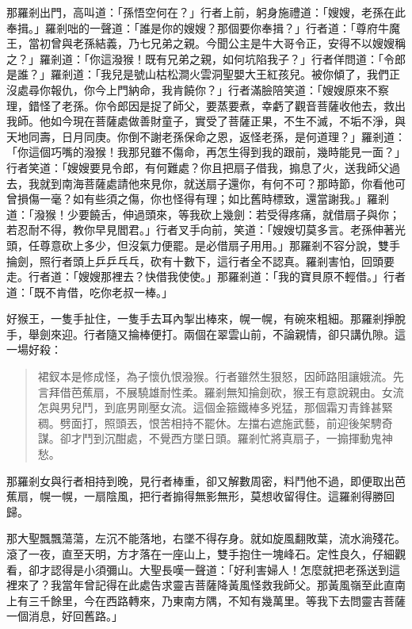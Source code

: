 那羅剎出門，高叫道：「孫悟空何在？」行者上前，躬身施禮道：「嫂嫂，老孫在此奉揖。」羅剎咄的一聲道：「誰是你的嫂嫂？那個要你奉揖？」行者道：「尊府牛魔王，當初曾與老孫結義，乃七兄弟之親。今聞公主是牛大哥令正，安得不以嫂嫂稱之？」羅剎道：「你這潑猴！既有兄弟之親，如何坑陷我子？」行者佯問道：「令郎是誰？」羅剎道：「我兒是號山枯松澗火雲洞聖嬰大王紅孩兒。被你傾了，我們正沒處尋你報仇，你今上門納命，我肯饒你？」行者滿臉陪笑道：「嫂嫂原來不察理，錯怪了老孫。你令郎因是捉了師父，要蒸要煮，幸虧了觀音菩薩收他去，救出我師。他如今現在菩薩處做善財童子，實受了菩薩正果，不生不滅，不垢不淨，與天地同壽，日月同庚。你倒不謝老孫保命之恩，返怪老孫，是何道理？」羅剎道：「你這個巧嘴的潑猴！我那兒雖不傷命，再怎生得到我的跟前，幾時能見一面？」行者笑道：「嫂嫂要見令郎，有何難處？你且把扇子借我，搧息了火，送我師父過去，我就到南海菩薩處請他來見你，就送扇子還你，有何不可？那時節，你看他可曾損傷一毫？如有些須之傷，你也怪得有理；如比舊時標致，還當謝我。」羅剎道：「潑猴！少要饒舌，伸過頭來，等我砍上幾劍：若受得疼痛，就借扇子與你；若忍耐不得，教你早見閻君。」行者叉手向前，笑道：「嫂嫂切莫多言。老孫伸著光頭，任尊意砍上多少，但沒氣力便罷。是必借扇子用用。」那羅剎不容分說，雙手掄劍，照行者頭上乒乒乓乓，砍有十數下，這行者全不認真。羅剎害怕，回頭要走。行者道：「嫂嫂那裡去？快借我使使。」那羅剎道：「我的寶貝原不輕借。」行者道：「既不肯借，吃你老叔一棒。」

好猴王，一隻手扯住，一隻手去耳內掣出棒來，幌一幌，有碗來粗細。那羅剎掙脫手，舉劍來迎。行者隨又掄棒便打。兩個在翠雲山前，不論親情，卻只講仇隙。這一場好殺：
\begin{quote}
裙釵本是修成怪，為子懷仇恨潑猴。行者雖然生狠怒，因師路阻讓娥流。先言拜借芭蕉扇，不展驍雄耐性柔。羅剎無知掄劍砍，猴王有意說親由。女流怎與男兒鬥，到底男剛壓女流。這個金箍鐵棒多兇猛，那個霜刃青鋒甚緊稠。劈面打，照頭丟，恨苦相持不罷休。左擋右遮施武藝，前迎後架騁奇謀。卻才鬥到沉酣處，不覺西方墜日頭。羅剎忙將真扇子，一搧揮動鬼神愁。
\end{quote}

那羅剎女與行者相持到晚，見行者棒重，卻又解數周密，料鬥他不過，即便取出芭蕉扇，幌一幌，一扇陰風，把行者搧得無影無形，莫想收留得住。這羅剎得勝回歸。

那大聖飄飄蕩蕩，左沉不能落地，右墜不得存身。就如旋風翻敗葉，流水淌殘花。滾了一夜，直至天明，方才落在一座山上，雙手抱住一塊峰石。定性良久，仔細觀看，卻才認得是小須彌山。大聖長嘆一聲道：「好利害婦人！怎麼就把老孫送到這裡來了？我當年曾記得在此處告求靈吉菩薩降黃風怪救我師父。那黃風嶺至此直南上有三千餘里，今在西路轉來，乃東南方隅，不知有幾萬里。等我下去問靈吉菩薩一個消息，好回舊路。」

